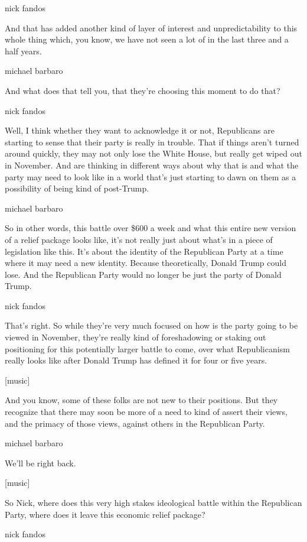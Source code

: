 nick fandos

And that has added another kind of layer of interest and
unpredictability to this whole thing which, you know, we have not seen a
lot of in the last three and a half years.

michael barbaro

And what does that tell you, that they're choosing this moment to do
that?

nick fandos

Well, I think whether they want to acknowledge it or not, Republicans
are starting to sense that their party is really in trouble. That if
things aren't turned around quickly, they may not only lose the White
House, but really get wiped out in November. And are thinking in
different ways about why that is and what the party may need to look
like in a world that's just starting to dawn on them as a possibility of
being kind of post-Trump.

michael barbaro

So in other words, this battle over \$600 a week and what this entire
new version of a relief package looks like, it's not really just about
what's in a piece of legislation like this. It's about the identity of
the Republican Party at a time where it may need a new identity. Because
theoretically, Donald Trump could lose. And the Republican Party would
no longer be just the party of Donald Trump.

nick fandos

That's right. So while they're very much focused on how is the party
going to be viewed in November, they're really kind of foreshadowing or
staking out positioning for this potentially larger battle to come, over
what Republicanism really looks like after Donald Trump has defined it
for four or five years.

{[}music{]}

And you know, some of these folks are not new to their positions. But
they recognize that there may soon be more of a need to kind of assert
their views, and the primacy of those views, against others in the
Republican Party.

michael barbaro

We'll be right back.

{[}music{]}

So Nick, where does this very high stakes ideological battle within the
Republican Party, where does it leave this economic relief package?

nick fandos


